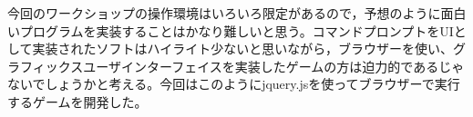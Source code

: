 
今回のワークショップの操作環境はいろいろ限定があるので，予想のように面白いプログラムを実装することはかなり難しいと思う。コマンドプロンプトをUIとして実装されたソフトはハイライト少ないと思いながら，ブラウザーを使い、グラフィックスユーザインターフェイスを実装したゲームの方は迫力的であるじゃないでしょうかと考える。今回はこのようにjquery.jsを使ってブラウザーで実行するゲームを開発した。